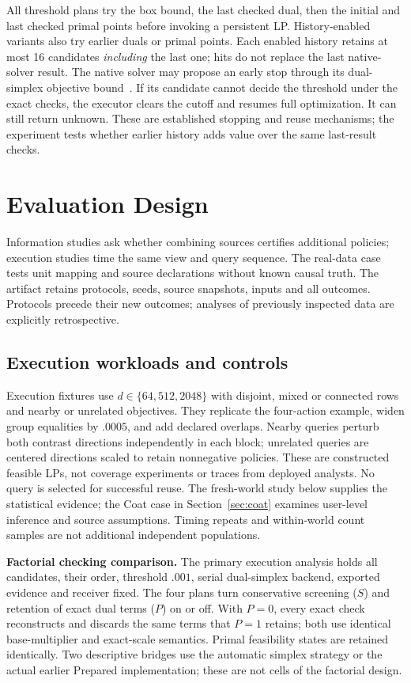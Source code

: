 \documentclass[conference]{IEEEtran}
\begin{document}
All threshold plans try the box bound, the last checked dual, then the initial and last checked primal points before invoking a persistent LP. History-enabled variants also try earlier duals or primal points. Each enabled history retains at most 16 candidates \emph{including} the last one; hits do not replace the last native-solver result. The native solver may propose an early stop through its dual-simplex objective bound~\cite{HiGHSOptions2026}. If its candidate cannot decide the threshold under the exact checks, the executor clears the cutoff and resumes full optimization. It can still return unknown. These are established stopping and reuse mechanisms; the experiment tests whether earlier history adds value over the same last-result checks.

\section{Evaluation Design}\label{sec:design}
Information studies ask whether combining sources certifies additional policies; execution studies time the same view and query sequence. The real-data case tests unit mapping and source declarations without known causal truth. The artifact retains protocols, seeds, source snapshots, inputs and all outcomes. Protocols precede their new outcomes; analyses of previously inspected data are explicitly retrospective.

\subsection{Execution workloads and controls}
Execution fixtures use $d\in\{64,512,2048\}$ with disjoint, mixed or connected rows and nearby or unrelated objectives. They replicate the four-action example, widen group equalities by $.0005$, and add declared overlaps. Nearby queries perturb both contrast directions independently in each block; unrelated queries are centered directions scaled to retain nonnegative policies. These are constructed feasible LPs, not coverage experiments or traces from deployed analysts. No query is selected for successful reuse. The fresh-world study below supplies the statistical evidence; the Coat case in Section~\ref{sec:coat} examines user-level inference and source assumptions. Timing repeats and within-world count samples are not additional independent populations.

\textbf{Factorial checking comparison.}
The primary execution analysis holds all candidates, their order, threshold $.001$, serial dual-simplex backend, exported evidence and receiver fixed. The four plans turn conservative screening ($S$) and retention of exact dual terms ($P$) on or off. With $P=0$, every exact check reconstructs and discards the same terms that $P=1$ retains; both use identical base-multiplier and exact-scale semantics. Primal feasibility states are retained identically. Two descriptive bridges use the automatic simplex strategy or the actual earlier Prepared implementation; these are not cells of the factorial design.
\end{document}
